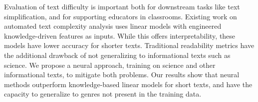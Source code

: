Evaluation of text difficulty is important both for downstream tasks like text simplification, and for supporting educators in classrooms. Existing work on automated text complexity analysis uses linear models with engineered knowledge-driven features as inputs. While this offers interpretability, these models have lower accuracy for shorter texts. Traditional readability metrics have the additional drawback of not generalizing to informational texts such as science. We propose a neural approach, training on science and other informational texts, to mitigate both problems. Our results show that neural methods outperform knowledge-based linear models for short texts, and have the capacity to generalize to genres not present in the training data.
